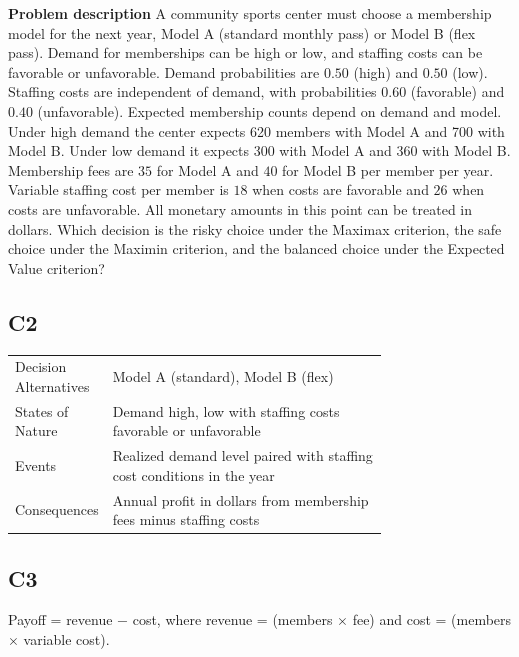 		\textbf{Problem description}
		A community sports center must choose a membership model for the next year, Model A (standard monthly pass)
		or Model B (flex pass). Demand for memberships can be high or low, and staffing costs can be favorable or unfavorable. Demand probabilities are $0.50$ (high) and $0.50$ (low). Staffing costs are independent of demand, with probabilities $0.60$ (favorable) and $0.40$ (unfavorable). Expected membership counts depend on demand and model. Under high demand the center expects 620 members with Model A and 700 with Model B. Under low demand it expects 300 with Model A and 360 with Model B. Membership fees are $35$ for Model A and $40$ for Model B per member per year. Variable staffing cost per member is $18$ when costs are favorable and $26$ when costs are unfavorable. All monetary amounts in this point can be treated in dollars. Which decision is the risky choice under the Maximax criterion, the safe choice under the Maximin criterion, and the balanced choice under the Expected Value criterion?

		\subsection*{C2}
		\begin{center}
			\begin{tabular}{l p{0.74\linewidth}}
				\toprule
				Decision Alternatives & Model A (standard), Model B (flex) \\
				States of Nature & Demand high, low with staffing costs favorable or unfavorable \\
				Events & Realized demand level paired with staffing cost conditions in the year \\
				Consequences & Annual profit in dollars from membership fees minus staffing costs \\
				\bottomrule
			\end{tabular}
		\end{center}

		\subsection*{C3}
		Payoff = revenue $-$ cost, where revenue = (members $\times$ fee) and cost = (members $\times$ variable cost).

